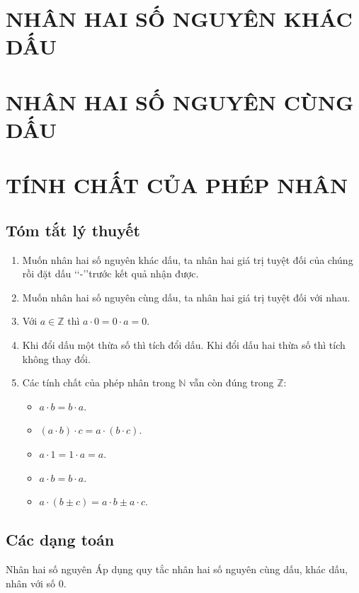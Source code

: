 \section{NHÂN HAI SỐ NGUYÊN KHÁC DẤU}
\section{NHÂN HAI SỐ NGUYÊN CÙNG DẤU}
\section{TÍNH CHẤT CỦA PHÉP NHÂN}
\subsection{Tóm tắt lý thuyết}
\begin{enumerate}
	\item Muốn nhân hai số nguyên khác dấu, ta nhân hai giá trị tuyệt đối của chúng rồi đặt dấu \lq\lq-\rq\rq \;trước kết quả nhận được.
	\item Muốn nhân hai số nguyên cùng dấu, ta nhân hai giá trị tuyệt đối với nhau.
	\item Với $ a\in \mathbb{Z} $ thì $ a \cdot 0=0 \cdot a=0 $.
	\item Khi đổi dấu một thừa số thì tích đổi dấu. Khi đổi dấu hai thừa số thì tích không thay đổi.
	\item Các tính chất của phép nhân trong $ \mathbb{N} $ vẫn còn đúng trong $ \mathbb{Z} $:
	\begin{itemize}
		\item $ a \cdot b=b \cdot a $.
		\item $ (a \cdot b)\cdot c=a \cdot (b \cdot c) $.
		\item $ a \cdot 1=1 \cdot a =a$.
		\item $ a \cdot b=b \cdot a $.
		\item $ a \cdot (b \pm c)=a \cdot b \pm a \cdot c $.		
	\end{itemize}
\end{enumerate}
\subsection{Các dạng toán}
\begin{dang}{Nhân hai số nguyên}
Áp dụng quy tắc nhân hai số nguyên cùng dấu, khác dấu, nhân với số $ 0 $.
\end{dang}


